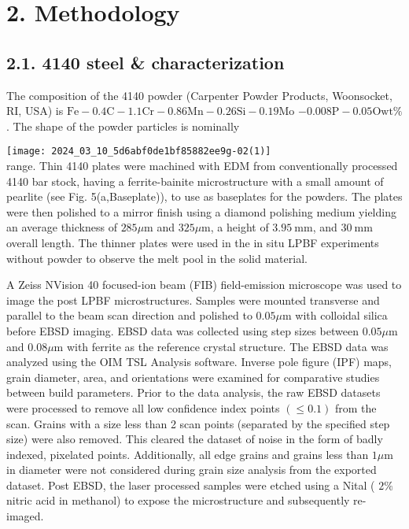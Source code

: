 \documentclass[10pt]{article}
\begin{document}
\section*{2. Methodology}
\subsection*{2.1. 4140 steel \& characterization}
The composition of the 4140 powder (Carpenter Powder Products, Woonsocket, RI, USA) is $\mathrm{Fe}-0.4 \mathrm{C}-1.1 \mathrm{Cr}-0.86 \mathrm{Mn}-0.26 \mathrm{Si}-0.19 \mathrm{Mo}$ $-0.008 \mathrm{P}-0.05 \mathrm{O} \mathrm{wt} \%$. The shape of the powder particles is nominally

\texttt{[image: 2024\_03\_10\_5d6abf0de1bf85882ee9g-02(1)]}\\
range. Thin 4140 plates were machined with EDM from conventionally processed 4140 bar stock, having a ferrite-bainite microstructure with a small amount of pearlite (see Fig. 5(a,Baseplate)), to use as baseplates for the powders. The plates were then polished to a mirror finish using a diamond polishing medium yielding an average thickness of $285 \mu \mathrm{m}$ and $325 \mu \mathrm{m}$, a height of $3.95 \mathrm{~mm}$, and $30 \mathrm{~mm}$ overall length. The thinner plates were used in the in situ LPBF experiments without powder to observe the melt pool in the solid material.

A Zeiss NVision 40 focused-ion beam (FIB) field-emission microscope was used to image the post LPBF microstructures. Samples were mounted transverse and parallel to the beam scan direction and polished to $0.05 \mu \mathrm{m}$ with colloidal silica before EBSD imaging. EBSD data was collected using step sizes between $0.05 \mu \mathrm{m}$ and $0.08 \mu \mathrm{m}$ with ferrite as the reference crystal structure. The EBSD data was analyzed using the OIM TSL Analysis software. Inverse pole figure (IPF) maps, grain diameter, area, and orientations were examined for comparative studies between build parameters. Prior to the data analysis, the raw EBSD datasets were processed to remove all low confidence index points $(\leq 0.1)$ from the scan. Grains with a size less than 2 scan points (separated by the specified step size) were also removed. This cleared the dataset of noise in the form of badly indexed, pixelated points. Additionally, all edge grains and grains less than $1 \mu \mathrm{m}$ in diameter were not considered during grain size analysis from the exported dataset. Post EBSD, the laser processed samples were etched using a Nital ( $2 \%$ nitric acid in methanol) to expose the microstructure and subsequently re-imaged.
\end{document}

